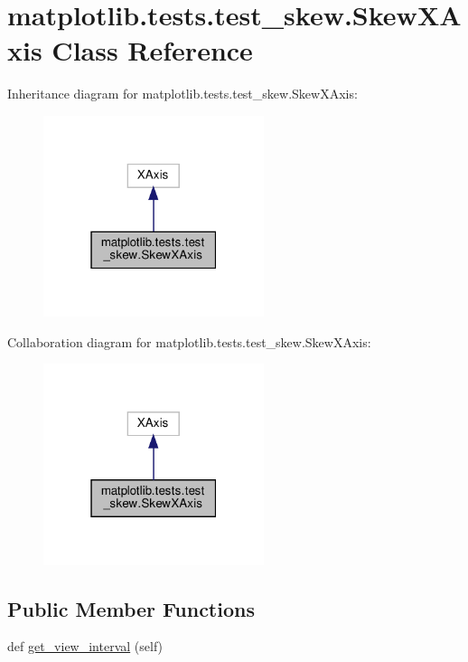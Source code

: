 \hypertarget{classmatplotlib_1_1tests_1_1test__skew_1_1SkewXAxis}{}\section{matplotlib.\+tests.\+test\+\_\+skew.\+Skew\+X\+Axis Class Reference}
\label{classmatplotlib_1_1tests_1_1test__skew_1_1SkewXAxis}


Inheritance diagram for matplotlib.\+tests.\+test\+\_\+skew.\+Skew\+X\+Axis\+:
\nopagebreak
\begin{figure}[H]
\begin{center}
\leavevmode
\includegraphics[width=183pt]{classmatplotlib_1_1tests_1_1test__skew_1_1SkewXAxis__inherit__graph}
\end{center}
\end{figure}


Collaboration diagram for matplotlib.\+tests.\+test\+\_\+skew.\+Skew\+X\+Axis\+:
\nopagebreak
\begin{figure}[H]
\begin{center}
\leavevmode
\includegraphics[width=183pt]{classmatplotlib_1_1tests_1_1test__skew_1_1SkewXAxis__coll__graph}
\end{center}
\end{figure}
\subsection*{Public Member Functions}
\begin{DoxyCompactItemize}
\item 
def \hyperlink{classmatplotlib_1_1tests_1_1test__skew_1_1SkewXAxis_a701e289f28beed80fc7b72ba59572cf2}{get\+\_\+view\+\_\+interval} (self)
\end{DoxyCompactItemize}


